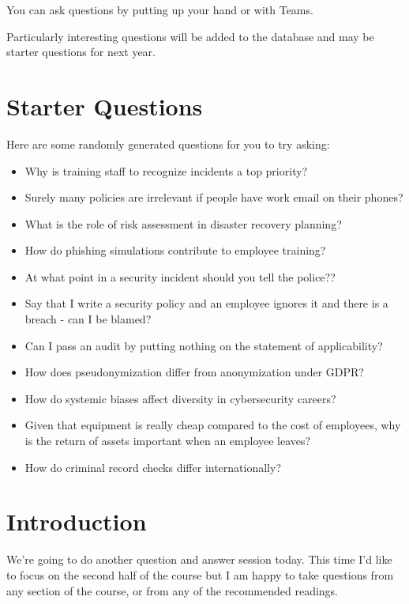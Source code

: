 \documentclass[12pt]{article}
\begin{document}
You can ask questions by putting up your hand or with Teams.  

Particularly interesting questions will be added to the database and may be starter questions for next year.  

\section*{Starter Questions} 
Here are some randomly generated questions for you to try asking: 

\begin{itemize}
  \item Why is training staff to recognize incidents a top priority?
  \item Surely many policies are irrelevant if people have work email on their phones?
  \item What is the role of risk assessment in disaster recovery planning?
  \item How do phishing simulations contribute to employee training?
  \item At what point in a security incident should you tell the police??
  \item Say that I write a security policy and an employee ignores it and there is a breach - can I be blamed?
  \item Can I pass an audit by putting nothing on the statement of applicability?
  \item How does pseudonymization differ from anonymization under GDPR?
  \item How do systemic biases affect diversity in cybersecurity careers?
  \item Given that equipment is really cheap compared to the cost of employees, why is the return of assets important when an employee leaves?
  \item How do criminal record checks differ internationally?
\end{itemize}


%
%



\maketitle

\section*{Introduction}
We're going to do another question and answer session today. This time I'd like to focus on the second half of the course but I am happy to take questions from any section of the course, or from any of the recommended readings. 
\end{document}

